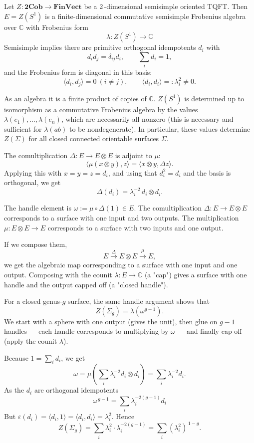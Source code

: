 \documentclass[12pt]{article}
\begin{document}
Let $Z:\mathbf{2Cob}\to \mathbf{FinVect}$ be a 2\,-dimensional semisimple oriented TQFT. Then $E = Z(S^1)$ is a finite-dimensional commutative semisimple Frobenius algebra over $\mathbb{C}$ with Frobenius form \[\lambda:Z(S^1)\to \mathbb{C}\]
Semisimple implies there are primitive orthogonal idempotents $d_i$ with
\[d_i d_j=\delta_{ij}d_i,\qquad \sum_i d_i=1,\]
and the Frobenius form is diagonal in this basis:
\[\langle d_i,d_j\rangle=0\ (i\neq j),\qquad \langle d_i,d_i\rangle=: \lambda_i^2\neq 0.\]

As an algebra it is a finite product of copies of $\mathbb{C}$. $Z(S^1)$ is determined up to isomorphism as a commutative Frobenius
algebra by the values $\lambda(e_1),\dots,\lambda(e_n)$, which are necessarily all nonzero (this is necessary and
sufficient for $\lambda(ab)$ to be nondegenerate). In particular, these values determine $Z(\Sigma)$ for all closed connected orientable surfaces $\Sigma$.




The comultiplication $\Delta:E\to E\otimes E$ is adjoint to $\mu$:
\[\langle \mu(x\otimes y),z\rangle=\langle x\otimes y,\Delta z\rangle.\]
Applying this with $x=y=z=d_i$, and using that $d_i^2=d_i$ and the basis is orthogonal, we get
\[\Delta(d_i)=\lambda_i^{-2}\, d_i\otimes d_i.\]

The handle element is $\omega:=\mu\circ\Delta(1)\in E$. The comultiplication $\Delta: E\to E\otimes E$ corresponds to a surface with one input and two outputs. The multiplication $\mu: E\otimes E\to E$ corresponds to a surface with two inputs and one output.

If we compose them,
\[E \xrightarrow{\ \Delta\ } E\otimes E \xrightarrow{\ \mu\ } E,\]
we get the algebraic map corresponding to a surface with one input and one output. Composing with the counit $\lambda: E\to \mathbb{C}$ (a "cap") gives a surface with one handle and the output capped off (a "closed handle").

For a closed genus-$g$ surface, the same handle argument shows that
\[Z(\Sigma_g) = \lambda(\omega^{g-1}).\]
We start with a sphere with one output (gives the unit), then glue on $g-1$ handles — each handle corresponds to multiplying by $\omega$ — and finally cap off (apply the counit $\lambda$).


Because $1=\sum_i d_i$, we get
\[\omega=\mu\!\left(\sum_i \lambda_i^{-2} d_i\otimes d_i\right)
=\sum_i \lambda_i^{-2} d_i.\]
As the $d_i$ are orthogonal idempotents \[\omega^{\,g-1}=\sum_i \lambda_i^{-2(g-1)}d_i\]
But $\varepsilon(d_i)=\langle d_i,1\rangle=\langle d_i,d_i\rangle=\lambda_i^2$. Hence
\[Z(\Sigma_g)=\sum_i \lambda_i^2\cdot \lambda_i^{-2(g-1)}=\sum_i (\lambda_i^2)^{\,1-g}.\]
\end{document}
